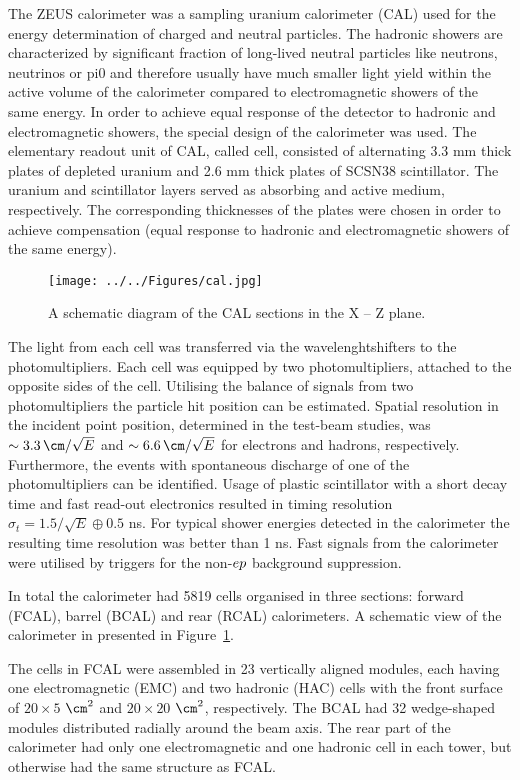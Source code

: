 The ZEUS calorimeter was a sampling uranium calorimeter (CAL) used for the energy determination of charged and neutral particles. 
The hadronic showers are characterized by significant fraction of long-lived neutral particles like neutrons, neutrinos or pi0 and therefore usually have much smaller light yield within the active volume of the calorimeter compared to electromagnetic showers of the same energy. In order to achieve equal response of the detector to hadronic and electromagnetic showers, the special design of the calorimeter was used. The elementary readout unit of CAL, called cell, consisted of alternating 3.3 mm thick plates of depleted uranium and 2.6 mm thick plates of SCSN38 scintillator. The uranium and scintillator layers served as absorbing and active medium, respectively. The corresponding thicknesses of the plates were chosen in order to achieve compensation (equal response to hadronic and electromagnetic showers of the same energy).

\begin{figure}[tpb]
	\centering
		\texttt{[image: ../../Figures/cal.jpg]}
	\caption{A schematic diagram of the CAL sections in the X -- Z plane.}
	\label{fig:cal}
\end{figure}

The light from each cell was transferred via the wavelenghtshifters to the photomultipliers. Each cell was equipped by two photomultipliers, attached to the opposite sides of the cell. Utilising the balance of signals from two photomultipliers the particle hit position can be estimated. Spatial resolution in the incident point position, determined in the test-beam studies, was $\sim 3.3\,\cm/\sqrt{E}$ and $\sim 6.6\,\cm/\sqrt{E}$ for electrons and hadrons, respectively. Furthermore, the events with spontaneous discharge of one of the photomultipliers can be identified. Usage of plastic scintillator with a short decay time and fast read-out electronics resulted in timing resolution $\sigma_t = 1.5/\sqrt{E} \oplus 0.5$ ns. For typical shower energies detected in the calorimeter the resulting time resolution was better than 1 ns. Fast signals from the calorimeter were utilised by triggers for the non-$\mbox{$e p$}$ background suppression. 

In total the calorimeter had 5819 cells organised in three sections: forward (FCAL), barrel (BCAL) and rear (RCAL) calorimeters. A schematic view of the calorimeter in presented in Figure~\ref{fig:cal}.

The cells in FCAL were assembled in 23 vertically aligned modules, each having one electromagnetic (EMC) and two hadronic (HAC) cells with the front surface of $20 \times 5$ $\cm^2$ and $20 \times 20$ $\cm^2$, respectively. The BCAL had 32 wedge-shaped modules distributed radially around the beam axis. The rear part of the calorimeter had only one electromagnetic and one hadronic cell in each tower, but otherwise had the same structure as FCAL.

